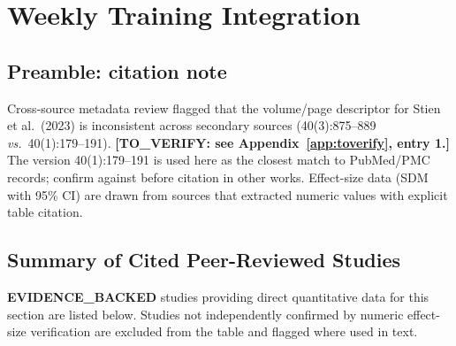 \section{Weekly Training Integration}
\label{sec:weekly}

\subsection*{Preamble: citation note}

Cross-source metadata review flagged that the volume/page descriptor for Stien et al.\ (2023) is inconsistent across secondary sources (40(3):875--889 \emph{vs.}\ 40(1):179--191). \textbf{[TO\_VERIFY: see Appendix~\ref{app:toverify}, entry 1.]} The version 40(1):179--191 is used here as the closest match to PubMed/PMC records; confirm against \cite{SO23} before citation in other works. Effect-size data (SDM with 95\% CI) are drawn from sources that extracted numeric values with explicit table citation.

\subsection{Summary of Cited Peer-Reviewed Studies}
\label{subsec:weekly_table}

\noindent\textbf{EVIDENCE\_BACKED} studies providing direct quantitative data for this section are listed below. Studies not independently confirmed by numeric effect-size verification are excluded from the table and flagged where used in text.

